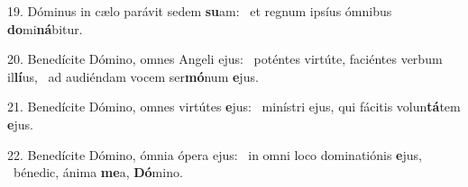 19. Dóminus in cælo parávit sedem \textbf{su}am: \ast\  et regnum ipsíus ómnibus \textbf{do}mi\textbf{ná}bitur.\

20. Benedícite Dómino, omnes Angeli ejus: \dag\  poténtes virtúte, faciéntes verbum il\textbf{lí}us, \ast\  ad audiéndam vocem ser\textbf{mó}num \textbf{e}jus.\

21. Benedícite Dómino, omnes virtútes \textbf{e}jus: \ast\  minístri ejus, qui fácitis volun\textbf{tá}tem \textbf{e}jus.\

22. Benedícite Dómino, ómnia ópera ejus: \dag\  in omni loco dominatiónis \textbf{e}jus, \ast\  bénedic, ánima \textbf{me}a, \textbf{Dó}mino.\

